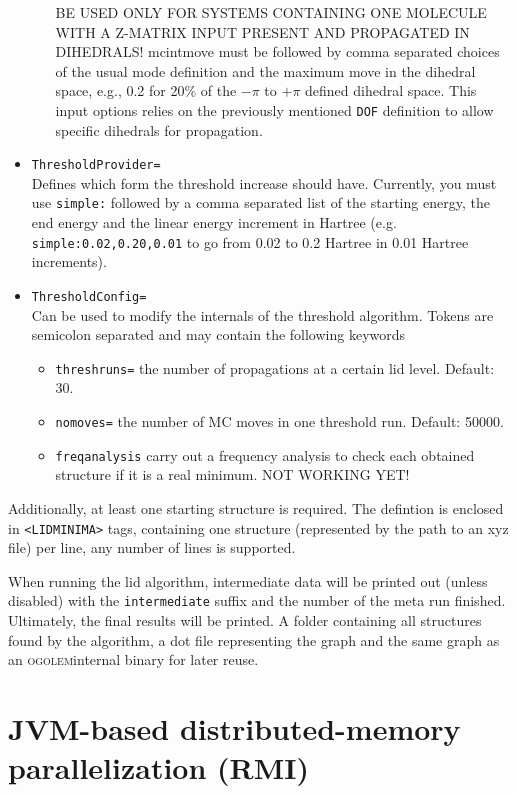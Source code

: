 \documentclass[a4paper,10pt]{scrbook}
\newcommand{\ogo}{\textsc{ogolem}}
\begin{document}
\begin{itemize}
\begin{itemize}
BE USED ONLY FOR SYSTEMS CONTAINING ONE MOLECULE WITH A Z-MATRIX INPUT PRESENT
AND PROPAGATED IN DIHEDRALS! mcintmove must be followed by comma separated
choices of the usual mode definition and the maximum move in the dihedral space,
e.g., 0.2 for 20\% of the $-\pi$ to $+\pi$ defined dihedral space. This input
options relies on the previously mentioned \texttt{DOF} definition to allow
specific dihedrals for propagation.
 \end{itemize}
 \item \texttt{ThresholdProvider=}\\ Defines which form the threshold increase
should have. Currently, you must use \texttt{simple:} followed by a comma
separated list of the starting energy, the end energy and the linear energy
increment in Hartree (e.g. \texttt{simple:0.02,0.20,0.01} to go from 0.02 to 0.2
Hartree in 0.01 Hartree increments).
 \item \texttt{ThresholdConfig=}\\Can be used to modify the internals of the
threshold algorithm. Tokens are semicolon separated and may contain the
following keywords
 \begin{itemize}
  \item \texttt{threshruns=} the number of propagations at a certain lid level.
Default: 30.
  \item \texttt{nomoves=} the number of MC moves in one threshold run. Default:
50000.
  \item \texttt{freqanalysis} carry out a frequency analysis to check each
obtained structure if it is a real minimum. NOT WORKING YET!
 \end{itemize}
\end{itemize}

Additionally, at least one starting structure is required. The defintion is
enclosed in \texttt{<LIDMINIMA>} tags, containing one structure (represented by
the path to an xyz file) per line, any number of lines is supported.

When running the lid algorithm, intermediate data will be printed out (unless
disabled) with the \texttt{intermediate} suffix and the number of the meta run
finished. Ultimately, the final results will be printed. A folder containing all
structures found by the algorithm, a dot file representing the graph and the
same graph as an \ogo internal binary for later reuse.

\chapter{JVM-based distributed-memory parallelization (RMI)}
\label{rmi}
\end{document}
